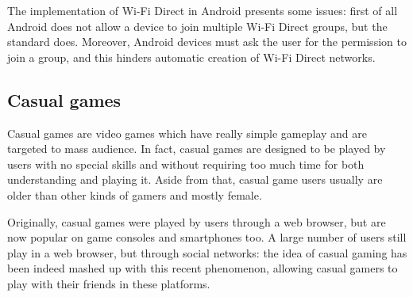 The implementation of Wi-Fi Direct in Android presents some issues: first of all
Android does not allow a device to join multiple Wi-Fi Direct groups,
but the standard does. Moreover, Android devices must ask the user for the
permission to join a group, and this hinders automatic creation of Wi-Fi Direct
networks.

\subsection{Casual games}
Casual games are video games which have really simple gameplay and are
targeted to mass audience. In fact, casual games are designed to be played
by users with no special skills and without requiring too much time for both
understanding and playing it. Aside from that, casual game users usually are
older than other kinds of gamers and mostly female.

Originally, casual games were played by users through a web browser, but are
now popular on game consoles and smartphones too. A large number of users still
play in a web browser, but through social networks: the idea of casual gaming
has been indeed mashed up with this recent phenomenon, allowing casual gamers to
play with their friends in these platforms.
